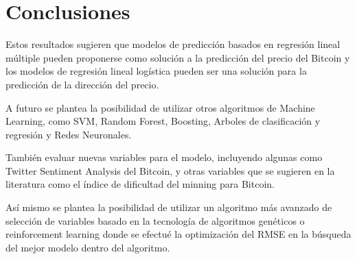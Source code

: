 \documentclass[a4paper,12pt,twocolumn]{article}
\begin{document}
\section{Conclusiones}

Estos resultados sugieren que modelos de predicción basados en regresión lineal múltiple  pueden proponerse como solución a la predicción del precio del Bitcoin y los modelos de regresión lineal logística pueden ser una solución para la predicción de la dirección del precio.

A futuro se plantea la posibilidad de utilizar otros algoritmos de Machine Learning, como SVM, Random Forest, Boosting, Arboles de clasificación y regresión y Redes Neuronales.

También evaluar nuevas variables para el modelo, incluyendo algunas como Twitter Sentiment Analysis del Bitcoin, y otras variables que se sugieren en la literatura como el índice de dificultad del minning para Bitcoin.

Así mismo se plantea la posibilidad de utilizar un algoritmo más avanzado de selección de variables basado en la tecnología de algoritmos genéticos o reinforcement learning donde se efectué la optimización del RMSE en la búsqueda del mejor modelo dentro del algoritmo. 
\end{document}
